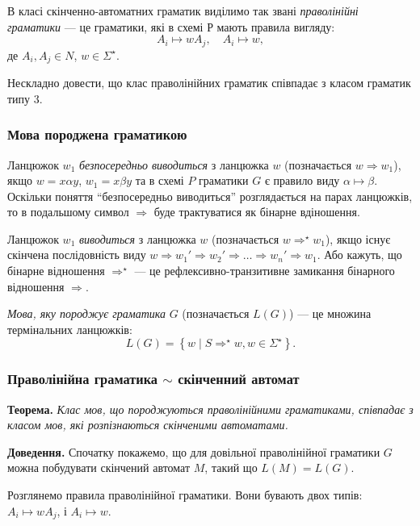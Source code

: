 В класі скінченно-автоматних граматик виділимо так звані \textit{праволінійні граматики} --- це граматики, які в схемі Р мають правила вигляду:
\[ A_i \mapsto w A_j, \quad A_i \mapsto w,\]
де $A_i, A_j \in N$, $w \in \Sigma^\star$. \medskip

Нескладно довести, що клас праволінійних граматик співпадає з класом граматик типу 3.

\subsubsection{Мова породжена граматикою}

Ланцюжок $w_1$ \textit{безпосередньо виводиться} з ланцюжка $w$ (позначається $w \Rightarrow w_1$), якщо $w = x \alpha y$, $w_1 = x \beta y$ та в схемі $P$ граматики $G$ є правило виду $\alpha \mapsto \beta$. Оскільки поняття ``безпосередньо виводиться'' розглядається на парах ланцюжків, то в подальшому символ $\Rightarrow$ буде трактуватися як бінарне вдіношення. \medskip

Ланцюжок $w_1$ \textit{виводиться} з ланцюжка $w$ (позначається $w \Rightarrow^\star w_1$), якщо існує скінчена послідовність виду $w \Rightarrow w_1' \Rightarrow w_2' \Rightarrow \ldots \Rightarrow w_n' \Rightarrow w_1$. Або кажуть, що бінарне відношення $\Rightarrow^\star$ --- це рефлексивно-транзитивне замикання бінарного відношення $\Rightarrow$. \medskip

\textit{Мова, яку породжує граматика} $G$ (позначається $L(G)$) --- це множина термінальних ланцюжків: 
\[ L(G) = \left\{ w \mid S \Rightarrow^\star w, w \in \Sigma^\star \right\}.\]

\subsubsection{Праволінійна граматика $\sim$ скінченний автомат}

\textbf{Теорема.} \textit{Клас мов, що породжуються праволінійними граматиками, співпадає з класом мов, які розпізнаються скінченими автоматами.}

\textbf{Доведення.} Спочатку покажемо, що для довільної праволінійної граматики $G$ можна побудувати скінчений автомат $M$, такий що $L(M) = L(G)$. \medskip

Розглянемо правила праволінійної граматики. Вони бувають двох типів: $A_i \mapsto w A_j$, і $A_i \mapsto w$. \medskip

